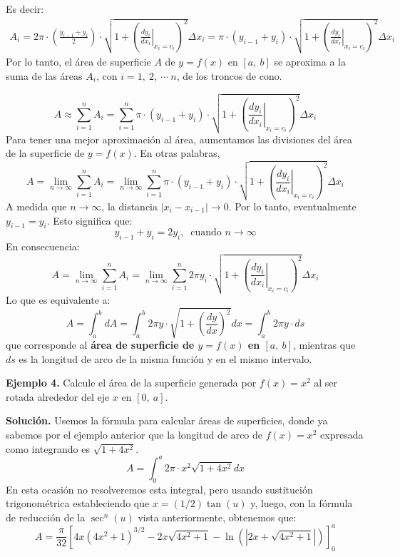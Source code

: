 \documentclass[12pt]{article}
\begin{document}
Es decir:
\begin{align*}
  A_{i} = 2 \pi \cdot \left(\frac{y_{i - 1} + y_{i}}{2}\right) \cdot
           \sqrt{1 + \left(\left. \frac{dy_{i}}{dx_{i}} \right|_{x_{i} = c_{i}}\right)^{2}} \Delta x_{i}
        = \pi \cdot (y_{i - 1} + y_{i}) \cdot
           \sqrt{1 + \left(\left. \frac{dy_{i}}{dx_{i}} \right|_{x_{i} = c_{i}}\right)^{2}} \Delta x_{i}
\end{align*}
Por lo tanto, el área de superficie $A$ de $y = f(x)$ en $[a, \ b]$ se aproxima a la suma de las áreas $A_{i}$, con $i = 1, \ 2, \ \cdots \ n$, de los troncos de cono.

\[
  A \approx \sum_{i = 1}^{n} A_{i}
    = \sum_{i = 1}^{n} \pi \cdot (y_{i - 1} + y_{i}) \cdot \sqrt{1 + \left(\left. \frac{dy_{i}}{dx_{i}} \right|_{x_{i} = c_{i}}\right)^{2}} \Delta x_{i}
\]
Para tener una mejor aproximación al área, aumentamos las divisiones del área de la superficie de $y = f(x)$. En otras palabras,
\[
  A = \lim_{n \to \infty} \sum_{i = 1}^{n} A_{i}
    = \lim_{n \to \infty} \sum_{i = 1}^{n} \pi \cdot (y_{i - 1} + y_{i}) \cdot
      \sqrt{1 + \left(\left. \frac{dy_{i}}{dx_{i}} \right|_{x_{i} = c_{i}}\right)^{2}} \Delta x_{i}
\]
A medida que $n \to \infty$, la distancia $|x_{i} - x_{i - 1}| \to 0$. Por lo tanto, eventualmente $y_{i - 1} = y_{i}$. Esto significa que:
\[
  y_{i - 1} + y_{i} = 2y_{i}, \ \text{ cuando } n \to \infty
\]
En consecuencia:
\[
  A = \lim_{n \to \infty} \sum_{i = 1}^{n} A_{i}
    = \lim_{n \to \infty} \sum_{i = 1}^{n} 2 \pi y_{i} \cdot \sqrt{1 + \left(\left. \frac{dy_{i}}{dx_{i}} \right|_{x_{i} = c_{i}}\right)^{2}} \Delta x_{i}
\]
Lo que es equivalente a:
\[
  A = \int_{a}^{b} dA
    = \int_{a}^{b} 2 \pi y \cdot \sqrt{1 + \left(\frac{dy}{dx}\right)^{2}} dx
    = \int_{a}^{b} 2 \pi y \cdot ds
\]
que corresponde al \textbf{área de superficie de $y = f(x)$ en $[a, \ b]$}, mientras que $ds$ es la longitud de arco de la misma función y en el mismo intervalo.

\textbf{Ejemplo 4.} Calcule el área de la superficie generada por $f(x) = x^{2}$ al ser rotada alrededor del eje $x$ en $[0, \ a]$.

\textbf{Solución.} Usemos la fórmula para calcular áreas de superficies, donde ya sabemos por el ejemplo anterior que la longitud de arco de $f(x) = x^{2}$ expresada como integrando es $\sqrt{1 + 4x^{2}}$.
\[
  A = \int_{0}^{a} 2 \pi \cdot x^{2} \sqrt{1 + 4x^{2}} dx
\]
En esta ocasión no resolveremos esta integral, pero usando sustitución trigonométrica estableciendo que $x = (1/2) \tan(u)$ y, luego, con la fórmula de reducción de la $\sec^{n}(u)$ vista anteriormente, obtenemos que:
\[
  A = \frac{\pi}{32} \left[4x (4x^{2} + 1)^{3/2} - 2x \sqrt{4x^{2} + 1} - \ln\left(\left|2x + \sqrt{4x^{2} + 1} \right|\right) \right]_{0}^{a}
\]
\end{document}

